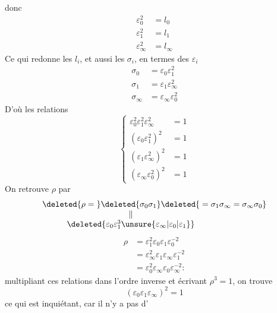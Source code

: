 donc
\[
\begin{aligned}
\varepsilon_0^2&=l_0\\
\varepsilon_1^2&=l_1\\
\varepsilon_\infty^2&=l_\infty
\end{aligned}
\]
Ce qui redonne les $l_i$, et aussi les $\sigma_i$,  en termes des $\varepsilon_i$
\[
\begin{aligned}
\sigma_0&=\varepsilon_0\varepsilon_1^2\\
\sigma_1&=\varepsilon_1\varepsilon_\infty^2\\
\sigma_\infty&=\varepsilon_\infty\varepsilon_0^2
\end{aligned}
\]
D'où les relations
\[
\left\{\begin{aligned}
\varepsilon_0^2\varepsilon_1^2\varepsilon_\infty^2&=1\\
(\varepsilon_0\varepsilon_1^2)^2&=1\\
(\varepsilon_1\varepsilon_\infty^2)^2&=1\\
(\varepsilon_\infty\varepsilon_0^2)^2&=1
\end{aligned}\right.
\]
On retrouve $\rho$  par
\[
\begin{array}{r@{}c@{}l}
\deleted{\rho={}}&\deleted{\sigma_0\sigma_1}&\deleted{{}=\sigma_1\sigma_\infty=\sigma_\infty\sigma_0}\\
&\Vert&\\
&\makebox[0pt][c]{$\deleted{\varepsilon_0\varepsilon_1^3\unsure{\varepsilon_\infty|\varepsilon_0|\varepsilon_1}}$}&
\end{array}
\]
\inserted{\[
\sigma_0\sigma_1=l_1^{-1}\rho
\]}
\[
\begin{aligned}
\rho&=\varepsilon_1^2\varepsilon_0\varepsilon_1\varepsilon_0^{-2}\\
&=\varepsilon_\infty^2\varepsilon_1\varepsilon_\infty\varepsilon_1^{-2}\\
&=\varepsilon_0^2\varepsilon_\infty\varepsilon_0\varepsilon_\infty^{-2}:
\end{aligned}
\]
multipliant  ces relations dans l'ordre inverse et écrivant $\rho^3=1$, on trouve
\[
(\varepsilon_0\varepsilon_1\varepsilon_\infty)^2=1
\]
ce qui est inquiétant, car il n'y a pas d'
